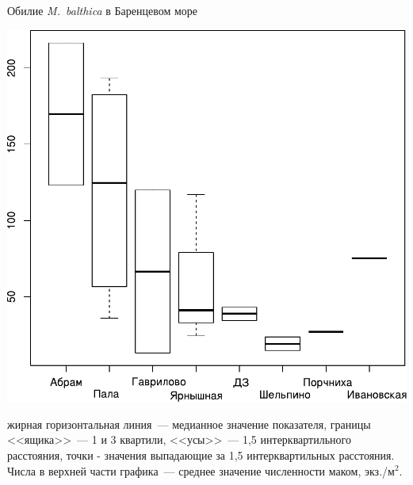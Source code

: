 \documentclass{beamer}
\begin{document}
\begin{frame}{Обилие {\it M.~balthica} в Баренцевом море}
\begin{minipage}[t]{.49\linewidth}
\begin{center}
			\includegraphics[width=\textwidth]{B_Barents_uchastki_ru1.pdf}
		\end{center}
	\end{minipage}

{\tiny жирная горизонтальная линия~--- медианное значение показателя, 
границы <<ящика>>~--- 1 и 3 квартили, <<усы>>~--- 1,5 интерквартильного расстояния, 
точки - значения выпадающие за 1,5 интерквартильных расстояния. 
Числа в верхней части графика~--- среднее значение численности маком, экз./м$^2$.}
\end{frame}
\end{document}
